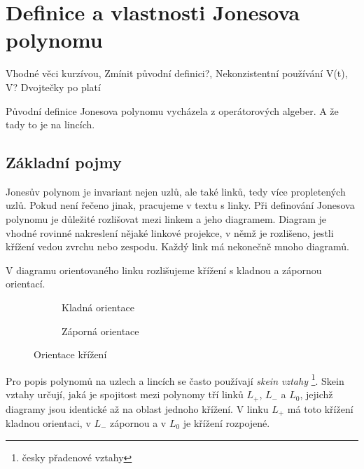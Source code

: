 
\chapter{Definice a vlastnosti Jonesova polynomu}

Vhodné věci kurzívou, Zmínit původní definici?, Nekonzistentní používání V(t), V? Dvojtečky po platí

Původní definice Jonesova polynomu vycházela z operátorových algeber. A že tady to je na lincích.
\section{Základní pojmy}
Jonesův polynom je invariant nejen uzlů, ale také linků, tedy více propletených uzlů. Pokud není řečeno jinak, pracujeme v textu s linky. 
Při definování Jonesova polynomu je důležité rozlišovat mezi linkem a jeho diagramem. Diagram je vhodné rovinné nakreslení nějaké linkové projekce, v němž je rozlišeno, jestli křížení vedou zvrchu nebo zespodu. Každý link má nekonečně mnoho diagramů.

V diagramu orientovaného linku rozlišujeme křížení s kladnou a zápornou orientací.

\begin{figure}[h]  
\centering 
\begin{subfigure}[t]{0.4\linewidth}\centering
{} 
\caption{Kladná orientace} 
\end{subfigure}
\begin{subfigure}[t]{0.4\linewidth}\centering
{}  
\caption{Záporná orientace}
\end{subfigure}
\caption{Orientace křížení}
\end{figure}  


Pro popis polynomů na uzlech a lincích se často používají \emph{skein vztahy} \footnote{česky přadenové vztahy}.
Skein vztahy určují, jaká je spojitost mezi polynomy tří linků $L_+$, $ L_-$ a $L_0$, jejichž diagramy jsou identické až na oblast jednoho křížení. V linku $L_+$ má toto křížení kladnou orientaci, v $L_-$ zápornou a v $L_0$ je křížení rozpojené.

